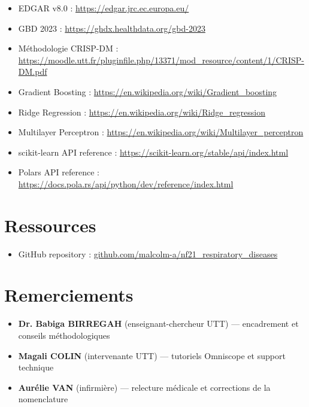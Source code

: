 \documentclass[11pt,a4paper]{article}
\begin{document}
\begin{itemize}[noitemsep]
    \item EDGAR v8.0 : \url{https://edgar.jrc.ec.europa.eu/}
    \item GBD 2023 : \url{https://ghdx.healthdata.org/gbd-2023}
    \item Méthodologie CRISP-DM : \url{https://moodle.utt.fr/pluginfile.php/13371/mod_resource/content/1/CRISP-DM.pdf}
    \item Gradient Boosting : \url{https://en.wikipedia.org/wiki/Gradient_boosting}
    \item Ridge Regression : \url{https://en.wikipedia.org/wiki/Ridge_regression}
    \item Multilayer Perceptron : \url{https://en.wikipedia.org/wiki/Multilayer_perceptron}
    \item scikit-learn API reference : \url{https://scikit-learn.org/stable/api/index.html}
    \item Polars API reference : \url{https://docs.pola.rs/api/python/dev/reference/index.html}

\end{itemize}

{}
\section*{Ressources}

\begin{itemize}[noitemsep]
    \item GitHub repository : \url{github.com/malcolm-a/nf21_respiratory_diseases}
    
\end{itemize}


{}
\section*{Remerciements}
\begin{itemize}[noitemsep]
    \item \textbf{Dr. Babiga BIRREGAH} (enseignant-chercheur UTT) — encadrement et conseils méthodologiques
    \item \textbf{Magali COLIN} (intervenante UTT) — tutoriels Omniscope et support technique
    \item \textbf{Aurélie VAN} (infirmière) — relecture médicale et corrections de la nomenclature
\end{itemize}
\end{document}
